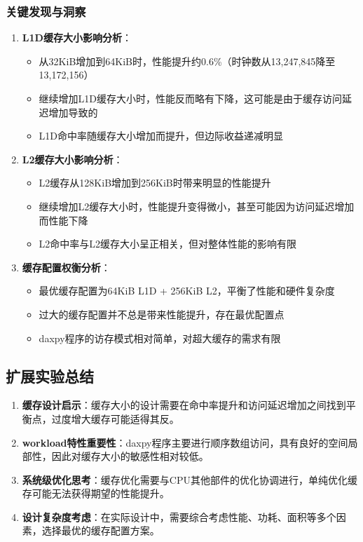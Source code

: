 \documentclass[a4paper]{article}
\begin{document}
\subsubsection{关键发现与洞察}

\begin{enumerate}
    \item \textbf{L1D缓存大小影响分析}：
    \begin{itemize}
        \item 从32KiB增加到64KiB时，性能提升约0.6\%（时钟数从13,247,845降至13,172,156）
        \item 继续增加L1D缓存大小时，性能反而略有下降，这可能是由于缓存访问延迟增加导致的
        \item L1D命中率随缓存大小增加而提升，但边际收益递减明显
    \end{itemize}
    
    \item \textbf{L2缓存大小影响分析}：
    \begin{itemize}
        \item L2缓存从128KiB增加到256KiB时带来明显的性能提升
        \item 继续增加L2缓存大小时，性能提升变得微小，甚至可能因为访问延迟增加而性能下降
        \item L2命中率与L2缓存大小呈正相关，但对整体性能的影响有限
    \end{itemize}
    
    \item \textbf{缓存配置权衡分析}：
    \begin{itemize}
        \item 最优缓存配置为64KiB L1D + 256KiB L2，平衡了性能和硬件复杂度
        \item 过大的缓存配置并不总是带来性能提升，存在最优配置点
        \item daxpy程序的访存模式相对简单，对超大缓存的需求有限
    \end{itemize}
\end{enumerate}

\subsection{扩展实验总结}

\begin{enumerate}
    \item \textbf{缓存设计启示}：缓存大小的设计需要在命中率提升和访问延迟增加之间找到平衡点，过度增大缓存可能适得其反。
    
    \item \textbf{workload特性重要性}：daxpy程序主要进行顺序数组访问，具有良好的空间局部性，因此对缓存大小的敏感性相对较低。
    
    \item \textbf{系统级优化思考}：缓存优化需要与CPU其他部件的优化协调进行，单纯优化缓存可能无法获得期望的性能提升。
    
    \item \textbf{设计复杂度考虑}：在实际设计中，需要综合考虑性能、功耗、面积等多个因素，选择最优的缓存配置方案。
\end{enumerate}
\end{document}
